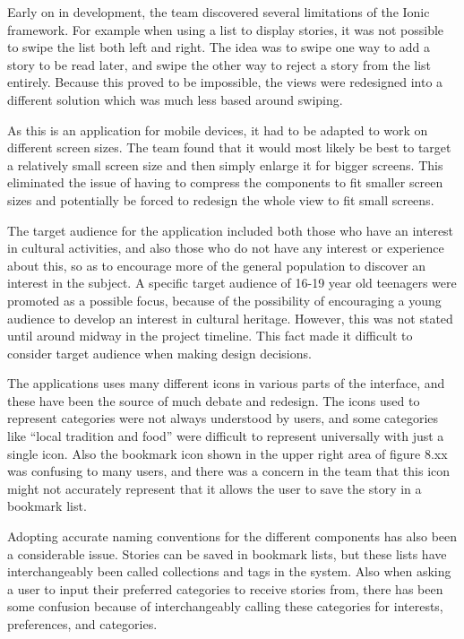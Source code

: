 Early on in development, the team discovered several limitations of the Ionic framework. For example when using a list to display stories, it was not possible to swipe the list both left and right. The idea was to swipe one way to add a story to be read later, and swipe the other way to reject a story from the list entirely.  Because this proved to be impossible, the views were redesigned into a different solution which was much less based around swiping.\newline

As this is an application for mobile devices, it had to be adapted to work on different screen sizes. The team found that it would most likely be best to target a relatively small screen size and then simply enlarge it for bigger screens. This eliminated the issue of having to compress the components to fit smaller screen sizes and potentially be forced to redesign the whole view to fit small screens.\newline

The target audience for the application included both those who have an interest in cultural activities, and also those who do not have any interest or experience about this, so as to encourage more of the general population to discover an interest in the subject. A specific target audience of 16-19 year old teenagers were promoted as a possible focus, because of the possibility of encouraging a young audience to develop an interest in cultural heritage. However, this was not stated until around  midway in the project timeline. This fact made it difficult to consider target audience when making design decisions. \newline

The applications uses many different icons in various parts of the interface, and these have been the source of much debate and redesign. The icons used to represent categories were not always understood by users, and some categories like “local tradition and food” were difficult to represent universally with just a single icon. Also the bookmark icon shown in the upper right area of figure 8.xx was confusing to many users, and there was a concern in the team that this icon might not accurately represent that it allows the user to save the story in a bookmark list.\newline

Adopting accurate naming conventions for the different components has also been a considerable issue. Stories can be saved in bookmark lists, but these lists have interchangeably been called collections and tags in the system. Also when asking a user to input their preferred categories to receive stories from, there has been some confusion because of interchangeably calling these categories for interests,  preferences, and categories.\newline

